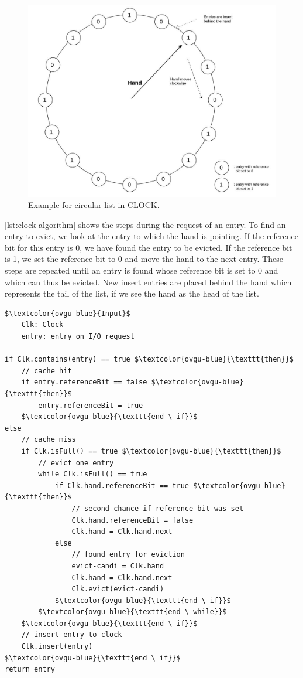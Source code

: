 \documentclass[
	12pt,
	a4paper,
	abstract,
	bibliography=totoc,
	chapterprefix,
	headings=openright,
	numbers=endperiod,
	parskip=half,
	twoside,
]{scrreprt}
\begin{document}
\begin{figure}[ht]
	\centering
	\includegraphics[scale=0.4]{clock.jpg}
	\caption{Example for circular list in CLOCK.}
		\label{fig:circular list for CLOCK}
\end{figure}

\cref{lst:clock-algorithm} shows the steps during the request of an entry.
To find an entry to evict, we look at the entry to which the hand is pointing.
If the reference bit for this entry is 0, we have found the entry to be evicted.
If the reference bit is 1, we set the reference bit to 0 and move the hand to the next entry.
These steps are repeated until an entry is found whose reference bit is set to 0 and which can thus be evicted.
New insert entries are placed behind the hand which represents the tail of the list, if we see the hand as the head of the list.

\bigskip

\begin{lstlisting}[mathescape=true,caption=CLOCK replacement algorithm in pseudocode,label=lst:clock-algorithm]
$\textcolor{ovgu-blue}{Input}$
	Clk: Clock
	entry: entry on I/O request

if Clk.contains(entry) == true $\textcolor{ovgu-blue}{\texttt{then}}$
	// cache hit
	if entry.referenceBit == false $\textcolor{ovgu-blue}{\texttt{then}}$
		entry.referenceBit = true
	$\textcolor{ovgu-blue}{\texttt{end \ if}}$
else
	// cache miss
	if Clk.isFull() == true $\textcolor{ovgu-blue}{\texttt{then}}$
		// evict one entry
		while Clk.isFull() == true
			if Clk.hand.referenceBit == true $\textcolor{ovgu-blue}{\texttt{then}}$
				// second chance if reference bit was set
				Clk.hand.referenceBit = false
				Clk.hand = Clk.hand.next
			else
				// found entry for eviction 
				evict-candi = Clk.hand
				Clk.hand = Clk.hand.next
				Clk.evict(evict-candi)
			$\textcolor{ovgu-blue}{\texttt{end \ if}}$
		$\textcolor{ovgu-blue}{\texttt{end \ while}}$
	$\textcolor{ovgu-blue}{\texttt{end \ if}}$
	// insert entry to clock
	Clk.insert(entry)
$\textcolor{ovgu-blue}{\texttt{end \ if}}$	
return entry 
\end{lstlisting}
\end{document}
